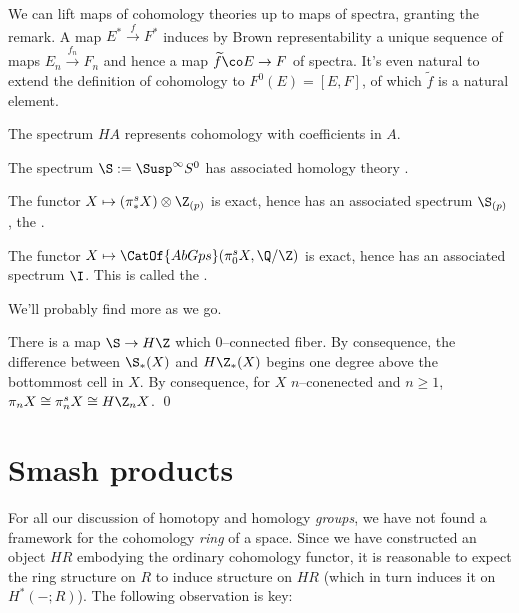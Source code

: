 We can lift maps of cohomology theories up to maps of spectra, granting the remark.  A map $E^* \xrightarrow f F^*$ induces by Brown representability a unique sequence of maps $E_n \xrightarrow{f_n} F_n$ and hence a map $\widetilde f\co E \to F$ of spectra.  It's even natural to extend the definition of cohomology to $F^0(E) = [E, F]$, of which $\widetilde f$ is a natural element.

\begin{example}
The spectrum $HA$ represents cohomology with coefficients in $A$.
\end{example}

\begin{example}
The spectrum $\S := \Susp^\infty S^0$ has associated homology theory .
\end{example}

\begin{example}
The functor $X \mapsto (\pi_*^s X) \otimes \Z_{(p)}$ is exact, hence has an associated spectrum $\S_{(p)}$, the .
\end{example}

\begin{example}
The functor $X \mapsto \CatOf{AbGps}(\pi_0^s X, \Q/\Z)$ is exact, hence has an associated spectrum $\I$.  This is called the .
\end{example}

We'll probably find more as we go.

\begin{theorem}[Hurewicz]
There is a map $\S \to H\Z$ which $0$--connected fiber.  By consequence, the difference between $\S_*(X)$ and $H\Z_*(X)$ begins one degree above the bottommost cell in $X$.  By consequence, for $X$ $n$--conenected and $n \ge 1$, $\pi_n X \cong \pi_n^s X \cong H\Z_n X$. \qed
\end{theorem}




\section{Smash products}


For all our discussion of homotopy and homology \emph{groups}, we have not found a framework for the cohomology \emph{ring} of a space.  Since we have constructed an object $HR$ embodying the ordinary cohomology functor, it is reasonable to expect the ring structure on $R$ to induce structure on $HR$ (which in turn induces it on $H^*(-; R)$).  The following observation is key:

